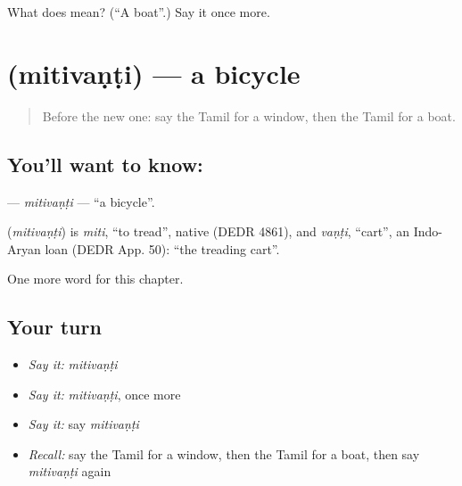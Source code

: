 \begin{tcolorbox}[breakable,colback=teal!4,colframe=teal!35!black,title={Before you move on}]
What does  mean? (\textquotedblleft{}A boat\textquotedblright{}.) Say it once more.
\end{tcolorbox}
\section[\texorpdfstring{\ta{மிதிவண்டி} (mitivaṇṭi)}{மிதிவண்டி (mitivaṇṭi)}]{ (mitivaṇṭi) — a bicycle}

\label{lesson:TA-C174-mitivanti}



\begin{quote}
Before the new one: say the Tamil for a window, then the Tamil for a boat.
\end{quote}

\subsection*{You'll want to know: }
\textbf{} — \emph{mitivaṇṭi} — \textquotedblleft{}a bicycle\textquotedblright{}.

\begin{cousinweb}
\textbf{} (\emph{mitivaṇṭi}) is \emph{miti}, \textquotedblleft{}to tread\textquotedblright{}, native (DEDR 4861), and \emph{vaṇṭi}, \textquotedblleft{}cart\textquotedblright{}, an Indo-Aryan loan (DEDR App. 50): \textquotedblleft{}the treading cart\textquotedblright{}.
\end{cousinweb}

\begin{grammarlens}[title={What you've built}]
One more word for this chapter.
\end{grammarlens}

\subsection*{Your turn}
\begin{itemize}
\raggedright
  \item \emph{Say it:} \emph{mitivaṇṭi}
  \item \emph{Say it:} \emph{mitivaṇṭi}, once more
  \item \emph{Say it:} say \emph{mitivaṇṭi}
  \item \emph{Recall:} say the Tamil for a window, then the Tamil for a boat, then say \emph{mitivaṇṭi} again
\end{itemize}

